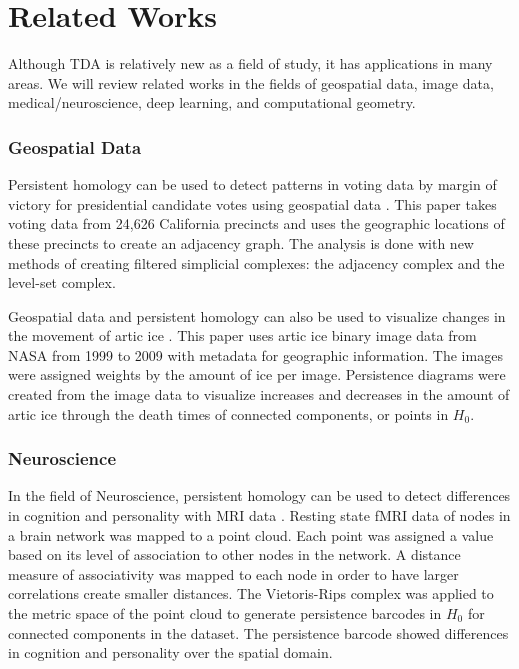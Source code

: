 \documentclass[ma]{uncgdissertationexp}
\theoremstyle{plain}
\theoremstyle{definition}
\theoremstyle{remark}
\begin{document}
\section{Related Works}
\par Although TDA is relatively new as a field of study, it has applications in many areas. We will review related works in the fields of geospatial data, image data, medical/neuroscience, deep learning, and computational geometry.
\subsubsection{Geospatial Data}
\par Persistent homology can be used to detect patterns in voting data by margin of victory for presidential candidate votes using geospatial data \cite{geospatial_voting}. This paper takes voting data from 24,626 California precincts and uses the geographic locations of these precincts to create an adjacency graph. The analysis is done with new methods of creating filtered simplicial complexes: the adjacency complex and the level-set complex.
\par Geospatial data and persistent homology can also be used to visualize changes in the movement of artic ice \cite{jocelyn_thesis}. This paper uses artic ice binary image data from NASA from 1999 to 2009 with metadata for geographic information. The images were assigned weights by the amount of ice per image. Persistence diagrams were created from the image data to visualize increases and decreases in the amount of artic ice through the death times of connected components, or points in $H_{0}$.
\subsubsection{Neuroscience}
\par In the field of Neuroscience, persistent homology can be used to detect differences in cognition and personality with MRI data \cite{TDA_MRI}. Resting state fMRI data of nodes in a brain network was mapped to a point cloud. Each point was assigned a value based on its level of association to other nodes in the network. A distance measure of associativity was mapped to each node in order to have larger correlations create smaller distances. The Vietoris-Rips complex was applied to the metric space of the point cloud to generate persistence barcodes in $H_{0}$ for connected components in the dataset. The persistence barcode showed differences in cognition and personality over the spatial domain.
\end{document}
